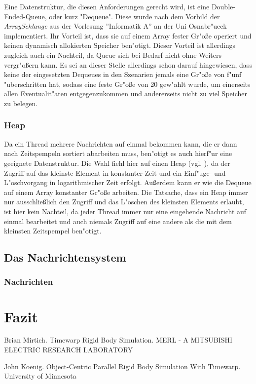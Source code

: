 \documentclass[a4paper, 10pt, openright, parskip, chapterprefix]{scrreprt}
\begin{document}
Eine Datenstruktur, die diesen Anforderungen gerecht wird, ist eine Double-Ended-Queue, oder kurz "Dequeue". Diese wurde
nach dem Vorbild der \emph{ArraySchlange} aus der Vorlesung ''Informatik A'' \cite{...} an der Uni Osnabr"ueck
implementiert. Ihr Vorteil ist, dass sie auf einem Array fester Gr"o\ss e operiert und keinen dynamisch allokierten
Speicher ben"otigt. Dieser Vorteil ist allerdings zugleich auch ein Nachteil, da Queue sich bei Bedarf nicht ohne
Weiters vergr"o\ss ern kann. Es sei an dieser Stelle allerdings schon darauf hingewiesen, dass keine der eingesetzten
Dequeues in den Szenarien jemals eine Gr"o\ss e von f"unf "uberschritten hat, sodass eine feste Gr"o\ss e von 20
gew"ahlt wurde, um einerseits allen Eventualit"aten entgegenzukommen und andererseits nicht zu viel Speicher zu belegen.

\subsection{Heap}
Da ein Thread mehrere Nachrichten auf einmal bekommen kann, die er dann nach Zeitspempeln sortiert abarbeiten muss,
ben"otigt es auch hierf"ur eine geeignete Datenstruktur. Die Wahl fiehl hier auf einen Heap (vgl. \cite{...}), da der
Zugriff auf das kleinste Element in konstanter Zeit und ein Einf"uge- und L"oschvorgang in logarithmischer Zeit erfolgt.
Au\ss erdem kann er wie die Dequeue auf einem Array konstanter Gr"o\ss e arbeiten.
Die Tatsache, dass ein Heap immer nur ausschlie\ss lich den Zugriff und das L"oschen des kleinsten Elements erlaubt, ist
hier kein Nachteil, da jeder Thread immer nur eine eingehende Nachricht auf einmal bearbeitet und auch niemals Zugriff auf eine
andere als die mit dem kleinsten Zeitspempel ben"otigt.

\section{Das Nachrichtensystem}
\subsection{Nachrichten}


\chapter{Fazit}
\begin{thebibliography}{10}
Brian Mirtich. Timewarp Rigid Body Simulation. MERL - A MITSUBISHI ELECTRIC RESEARCH LABORATORY

John Koenig. Object-Centric Parallel Rigid Body Simulation With Timewarp. University of Minnesota
\end{thebibliography}
\end{document}
